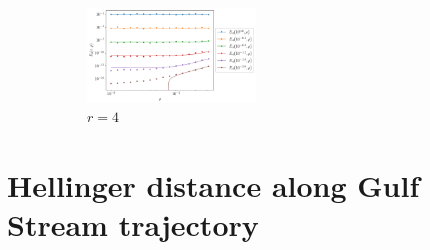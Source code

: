\begin{figure}
\begin{center}
\begin{subfigure}{\textwidth}
			\includegraphics[width=0.49\textwidth]{chp04_paper_numerics/figures/multiplicative/str_err_rho_r_4.0_log.pdf}
			\caption{\(r = 4\)}
		\end{subfigure}
		\caption{}
		\label{fig:multiplicative_lines_extra}
	\end{center}
\end{figure}


\section{Hellinger distance along Gulf Stream trajectory}\label{app:supp_hell_natl}

